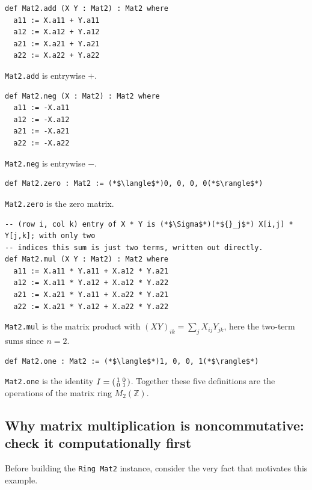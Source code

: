 \begin{lstlisting}
def Mat2.add (X Y : Mat2) : Mat2 where
  a11 := X.a11 + Y.a11
  a12 := X.a12 + Y.a12
  a21 := X.a21 + Y.a21
  a22 := X.a22 + Y.a22
\end{lstlisting}

\texttt{Mat2.add} is entrywise \(+\).

\begin{lstlisting}
def Mat2.neg (X : Mat2) : Mat2 where
  a11 := -X.a11
  a12 := -X.a12
  a21 := -X.a21
  a22 := -X.a22
\end{lstlisting}

\texttt{Mat2.neg} is entrywise \(-\).

\begin{lstlisting}
def Mat2.zero : Mat2 := (*$\langle$*)0, 0, 0, 0(*$\rangle$*)
\end{lstlisting}

\texttt{Mat2.zero} is the zero matrix.

\begin{lstlisting}
-- (row i, col k) entry of X * Y is (*$\Sigma$*)(*${}_j$*) X[i,j] * Y[j,k]; with only two
-- indices this sum is just two terms, written out directly.
def Mat2.mul (X Y : Mat2) : Mat2 where
  a11 := X.a11 * Y.a11 + X.a12 * Y.a21
  a12 := X.a11 * Y.a12 + X.a12 * Y.a22
  a21 := X.a21 * Y.a11 + X.a22 * Y.a21
  a22 := X.a21 * Y.a12 + X.a22 * Y.a22
\end{lstlisting}

\texttt{Mat2.mul} is the matrix product with \((XY)_{ik} = \sum_j X_{ij}Y_{jk}\), here the two-term sums since \(n = 2\).

\begin{lstlisting}
def Mat2.one : Mat2 := (*$\langle$*)1, 0, 0, 1(*$\rangle$*)
\end{lstlisting}

\texttt{Mat2.one} is the identity \(I = \begin{psmallmatrix}1&0\\0&1\end{psmallmatrix}\). Together these five definitions are the operations of the matrix ring \(M_2(\mathbb{Z})\).

\subsection{Why matrix multiplication is noncommutative: check it computationally first}\label{sec:09-rings:07-matrices:2}

Before building the \texttt{Ring Mat2} instance, consider the very fact that motivates this example.


